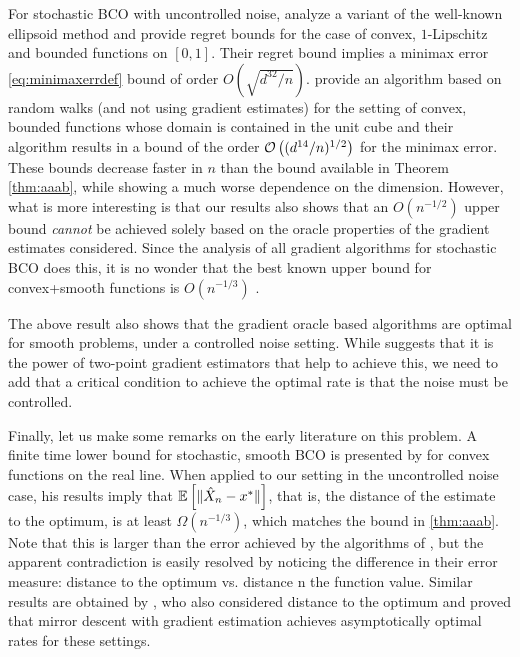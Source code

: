 For stochastic BCO with uncontrolled noise, \cite{AgFoHsuKaRa13:SIAM} analyze a variant of the well-known ellipsoid method and provide regret bounds for the case of convex, $1$-Lipschitz and bounded functions on $[0,1]$. Their regret bound implies a minimax error \eqref{eq:minimaxerrdef} bound of order  $O\left(\sqrt{d^{32}/n}\right)$.
\cite{liang2014zeroth} provide an algorithm based on random walks (and not using gradient estimates) for the setting of convex, bounded functions whose domain is contained in the unit cube and their algorithm results in a bound of the order $\mathcal{O}\left((d^{14}/n)^{1/2}\right)$ for the minimax error.
These bounds decrease faster in $n$ than the bound available in Theorem \ref{thm:aaab}, while showing a much worse dependence on the dimension.
However, what is more interesting is that our results also shows that an $O(n^{-1/2})$ upper bound \emph{cannot} be achieved solely based on the oracle properties of the gradient estimates considered. Since the analysis of all gradient algorithms for stochastic BCO does this, it is no wonder that the best known upper bound for convex+smooth functions is $O(n^{-1/3})$ \citep{saha2011improved}.

The above result also shows that the gradient oracle based algorithms are optimal for smooth problems, under a controlled noise setting.
While \cite{duchi2015optimal} suggests that it is the power of two-point gradient estimators that help to achieve this, we need to add that a critical condition to achieve the optimal rate is that the noise must be controlled. 

Finally, let us make some remarks on the early literature on this problem.
A finite time lower bound for stochastic, smooth BCO is presented by  \citet{Chen88:LB-AoS} for
convex functions on the real line. When applied to our setting in the uncontrolled noise case, his results imply that $\mathbb{E}\left[ \|\hat{X}_n - x^* \|\right]$, that is, the distance of the estimate to the optimum, is at least $\Omega(n^{-1/3})$, which matches the bound in \cref{thm:aaab}.
Note that this is larger than the error achieved by the algorithms of \cite{liang2014zeroth,BubeckDKP15,BuEl15}, but the apparent contradiction is easily resolved by noticing the difference in their error measure: distance to the optimum vs. distance n the function value.
Similar results are obtained by \citet{PoTsy90}, who also considered distance to the optimum and proved that mirror descent with gradient estimation achieves asymptotically optimal rates for these settings.

